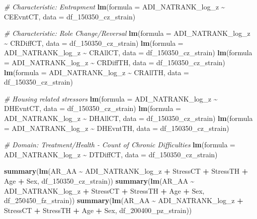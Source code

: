 \documentclass[
]{article}
\newenvironment{Shaded}{\begin{snugshade}}{\end{snugshade}}
\newcommand{\AttributeTok}[1]{\textcolor[rgb]{0.13,0.29,0.53}{#1}}
\newcommand{\CommentTok}[1]{\textcolor[rgb]{0.56,0.35,0.01}{\textit{#1}}}
\newcommand{\FunctionTok}[1]{\textcolor[rgb]{0.13,0.29,0.53}{\textbf{#1}}}
\newcommand{\NormalTok}[1]{#1}
\newcommand{\SpecialCharTok}[1]{\textcolor[rgb]{0.81,0.36,0.00}{\textbf{#1}}}
\begin{document}
\begin{Shaded}
\begin{Highlighting}[]
\CommentTok{\# Characteristic: Entrapment}
\FunctionTok{lm}\NormalTok{(}\AttributeTok{formula =}\NormalTok{ ADI\_NATRANK\_log\_z }\SpecialCharTok{\textasciitilde{}}\NormalTok{ CEEvntCT, }\AttributeTok{data =}\NormalTok{ df\_150350\_cz\_strain)}

\CommentTok{\# Characteristic: Role Change/Reversal}
\FunctionTok{lm}\NormalTok{(}\AttributeTok{formula =}\NormalTok{ ADI\_NATRANK\_log\_z }\SpecialCharTok{\textasciitilde{}}\NormalTok{ CRDiffCT, }\AttributeTok{data =}\NormalTok{ df\_150350\_cz\_strain)}
\FunctionTok{lm}\NormalTok{(}\AttributeTok{formula =}\NormalTok{ ADI\_NATRANK\_log\_z }\SpecialCharTok{\textasciitilde{}}\NormalTok{ CRAllCT, }\AttributeTok{data =}\NormalTok{ df\_150350\_cz\_strain)}
\FunctionTok{lm}\NormalTok{(}\AttributeTok{formula =}\NormalTok{ ADI\_NATRANK\_log\_z }\SpecialCharTok{\textasciitilde{}}\NormalTok{ CRDiffTH, }\AttributeTok{data =}\NormalTok{ df\_150350\_cz\_strain)}
\FunctionTok{lm}\NormalTok{(}\AttributeTok{formula =}\NormalTok{ ADI\_NATRANK\_log\_z }\SpecialCharTok{\textasciitilde{}}\NormalTok{ CRAllTH, }\AttributeTok{data =}\NormalTok{ df\_150350\_cz\_strain)}

\CommentTok{\# Housing related stressors}
\FunctionTok{lm}\NormalTok{(}\AttributeTok{formula =}\NormalTok{ ADI\_NATRANK\_log\_z }\SpecialCharTok{\textasciitilde{}}\NormalTok{ DHEvntCT, }\AttributeTok{data =}\NormalTok{ df\_150350\_cz\_strain)}
\FunctionTok{lm}\NormalTok{(}\AttributeTok{formula =}\NormalTok{ ADI\_NATRANK\_log\_z }\SpecialCharTok{\textasciitilde{}}\NormalTok{ DHAllCT, }\AttributeTok{data =}\NormalTok{ df\_150350\_cz\_strain)}
\FunctionTok{lm}\NormalTok{(}\AttributeTok{formula =}\NormalTok{ ADI\_NATRANK\_log\_z }\SpecialCharTok{\textasciitilde{}}\NormalTok{ DHEvntTH, }\AttributeTok{data =}\NormalTok{ df\_150350\_cz\_strain)}

\CommentTok{\# Domain: Treatment/Health {-} Count of Chronic Difficulties}
\FunctionTok{lm}\NormalTok{(}\AttributeTok{formula =}\NormalTok{ ADI\_NATRANK\_log\_z }\SpecialCharTok{\textasciitilde{}}\NormalTok{ DTDiffCT, }\AttributeTok{data =}\NormalTok{ df\_150350\_cz\_strain)}

\FunctionTok{summary}\NormalTok{(}\FunctionTok{lm}\NormalTok{(AR\_AA }\SpecialCharTok{\textasciitilde{}}\NormalTok{ ADI\_NATRANK\_log\_z }\SpecialCharTok{+}\NormalTok{ StressCT }\SpecialCharTok{+}\NormalTok{ StressTH }\SpecialCharTok{+}\NormalTok{ Age }\SpecialCharTok{+}\NormalTok{ Sex, df\_150350\_cz\_strain))}
\FunctionTok{summary}\NormalTok{(}\FunctionTok{lm}\NormalTok{(AR\_AA }\SpecialCharTok{\textasciitilde{}}\NormalTok{ ADI\_NATRANK\_log\_z }\SpecialCharTok{+}\NormalTok{ StressCT }\SpecialCharTok{+}\NormalTok{ StressTH }\SpecialCharTok{+}\NormalTok{ Age }\SpecialCharTok{+}\NormalTok{ Sex, df\_250450\_fz\_strain))}
\FunctionTok{summary}\NormalTok{(}\FunctionTok{lm}\NormalTok{(AR\_AA }\SpecialCharTok{\textasciitilde{}}\NormalTok{ ADI\_NATRANK\_log\_z }\SpecialCharTok{+}\NormalTok{ StressCT }\SpecialCharTok{+}\NormalTok{ StressTH }\SpecialCharTok{+}\NormalTok{ Age }\SpecialCharTok{+}\NormalTok{ Sex, df\_200400\_pz\_strain))}


\end{Highlighting}
\end{Shaded}
\end{document}
